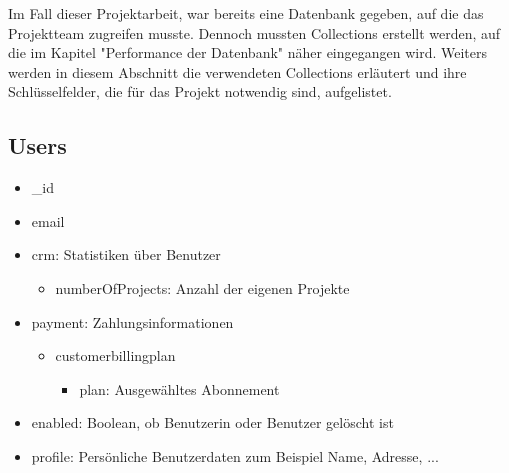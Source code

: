 Im Fall dieser Projektarbeit, war bereits eine Datenbank gegeben, auf die das Projektteam zugreifen musste. Dennoch mussten Collections erstellt werden, auf die im Kapitel "Performance der Datenbank" näher eingegangen wird. Weiters werden in diesem Abschnitt die verwendeten Collections erläutert und ihre Schlüsselfelder, die für das Projekt notwendig sind, aufgelistet.
\newpage
\subsection{Users}
\begin{itemize}
    \item \_id
    \item email
    \item crm: Statistiken über Benutzer
        \begin{itemize}
            \item numberOfProjects: Anzahl der eigenen Projekte
        \end{itemize}
    \item payment: Zahlungsinformationen
        \begin{itemize}
            \item customerbillingplan
            \begin{itemize}
                \item plan: Ausgewähltes Abonnement
            \end{itemize}
        \end{itemize}
    \item enabled: Boolean, ob Benutzerin oder Benutzer gelöscht ist
    \item profile: Persönliche Benutzerdaten zum Beispiel Name, Adresse, ...
\end{itemize}

